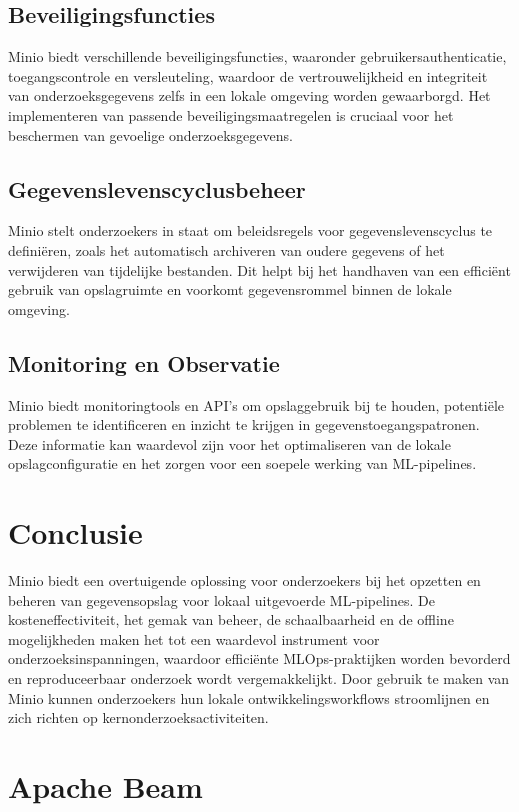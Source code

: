 \subsection{Beveiligingsfuncties}
Minio biedt verschillende beveiligingsfuncties, waaronder gebruikersauthenticatie, toegangscontrole en versleuteling, waardoor de vertrouwelijkheid en integriteit van onderzoeksgegevens zelfs in een lokale omgeving worden gewaarborgd. Het implementeren van passende beveiligingsmaatregelen is cruciaal voor het beschermen van gevoelige onderzoeksgegevens.

\subsection{Gegevenslevenscyclusbeheer}
Minio stelt onderzoekers in staat om beleidsregels voor gegevenslevenscyclus te definiëren, zoals het automatisch archiveren van oudere gegevens of het verwijderen van tijdelijke bestanden. Dit helpt bij het handhaven van een efficiënt gebruik van opslagruimte en voorkomt gegevensrommel binnen de lokale omgeving.

\subsection{Monitoring en Observatie}
Minio biedt monitoringtools en API's om opslaggebruik bij te houden, potentiële problemen te identificeren en inzicht te krijgen in gegevenstoegangspatronen. Deze informatie kan waardevol zijn voor het optimaliseren van de lokale opslagconfiguratie en het zorgen voor een soepele werking van ML-pipelines.

\section{Conclusie}

Minio biedt een overtuigende oplossing voor onderzoekers bij het opzetten en beheren van gegevensopslag voor lokaal uitgevoerde ML-pipelines. De kosteneffectiviteit, het gemak van beheer, de schaalbaarheid en de offline mogelijkheden maken het tot een waardevol instrument voor onderzoeksinspanningen, waardoor efficiënte MLOps-praktijken worden bevorderd en reproduceerbaar onderzoek wordt vergemakkelijkt. Door gebruik te maken van Minio kunnen onderzoekers hun lokale ontwikkelingsworkflows stroomlijnen en zich richten op kernonderzoeksactiviteiten.

\section{Apache Beam}

